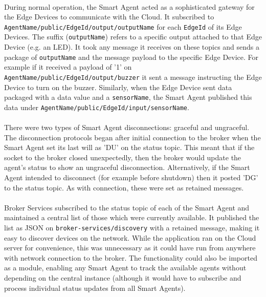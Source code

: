 \paragraph{} %
During normal operation, the Smart Agent acted as a sophisticated gateway for the Edge Devices to communicate with the Cloud. It subscribed to \verb|AgentName/public/EdgeId/output/outputName| for each \verb|EdgeId| of its Edge Devices. The suffix (\verb|outputName|) refers to a specific output attached to that Edge Device (e.g. an LED). It took any message it receives on these topics and sends a package of \verb|outputName| and the message payload to the specific Edge Device. For example if it received a payload of '1' on \verb|AgentName/public/EdgeId/output/buzzer| it sent a message instructing the Edge Device to turn on the buzzer. Similarly, when the Edge Device sent data packaged with a data value and a \verb|sensorName|, the Smart Agent published this data under \verb|AgentName/public/EdgeId/input/sensorName|.

\paragraph{} %
There were two types of Smart Agent disconnections: graceful and ungraceful. The disconnection protocols began after initial connection to the broker when the Smart Agent set its last will as 'DU' on the status topic. This meant that if the socket to the broker closed unexpectedly, then the broker would update the agent's status to show an ungraceful disconnection. Alternatively, if the Smart Agent intended to disconnect (for example before shutdown) then it posted 'DG' to the status topic. As with connection, these were set as retained messages.

\paragraph{} %
Broker Services subscribed to the status topic of each of the Smart Agent and maintained a central list of those which were currently available. It published the list as JSON on \verb|broker-services/discovery| with a retained message, making it easy to discover devices on the network. While the application ran on the Cloud server for convenience, this was unnecessary as it could have run from anywhere with network connection to the broker. The functionality could also be imported as a module, enabling any Smart Agent to track the available agents without depending on the central instance (although it would have to subscribe and process individual status updates from all Smart Agents).

